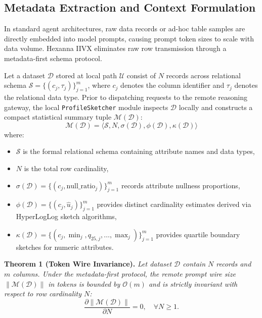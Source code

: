 \subsection{Metadata Extraction and Context Formulation}
In standard agent architectures, raw data records or ad-hoc table samples are directly embedded into model prompts, causing prompt token sizes to scale with data volume. Hexanna IIVX eliminates raw row transmission through a metadata-first schema protocol.

Let a dataset $\mathcal{D}$ stored at local path $\mathcal{U}$ consist of $N$ records across relational schema $\mathcal{S} = \{(c_j, \tau_j)\}_{j=1}^m$, where $c_j$ denotes the column identifier and $\tau_j$ denotes the relational data type. Prior to dispatching requests to the remote reasoning gateway, the local \texttt{ProfileSketcher} module inspects $\mathcal{D}$ locally and constructs a compact statistical summary tuple $\mathcal{M}(\mathcal{D})$:
\begin{equation}
    \mathcal{M}(\mathcal{D}) = \langle \mathcal{S}, N, \sigma(\mathcal{D}), \phi(\mathcal{D}), \kappa(\mathcal{D}) \rangle
\end{equation}
where:
\begin{itemize}
    \item $\mathcal{S}$ is the formal relational schema containing attribute names and data types,
    \item $N$ is the total row cardinality,
    \item $\sigma(\mathcal{D}) = \{ (c_j, \text{null\_ratio}_j) \}_{j=1}^m$ records attribute nullness proportions,
    \item $\phi(\mathcal{D}) = \{ (c_j, \hat{u}_j) \}_{j=1}^m$ provides distinct cardinality estimates derived via HyperLogLog sketch algorithms,
    \item $\kappa(\mathcal{D}) = \{ (c_j, \min_j, q_{25, j}, \dots, \max_j) \}_{j=1}^m$ provides quartile boundary sketches for numeric attributes.
\end{itemize}

\noindent\textbf{Theorem 1 (Token Wire Invariance).} \textit{Let dataset $\mathcal{D}$ contain $N$ records and $m$ columns. Under the metadata-first protocol, the remote prompt wire size $\|\mathcal{M}(\mathcal{D})\|$ in tokens is bounded by $\mathcal{O}(m)$ and is strictly invariant with respect to row cardinality $N$:}
\begin{equation}
    \frac{\partial \|\mathcal{M}(\mathcal{D})\|}{\partial N} = 0, \quad \forall N \ge 1.
\end{equation}

